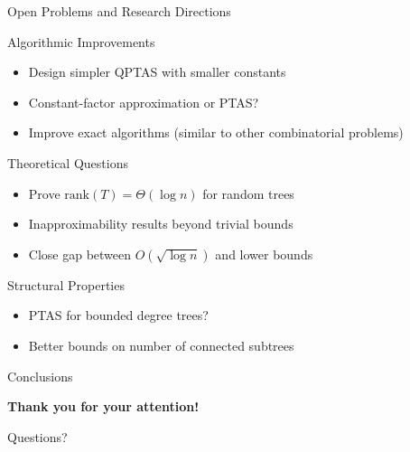 \documentclass[aspectratio=169]{beamer}
\begin{document}
\begin{frame}{Open Problems and Research Directions}
\begin{block}{Algorithmic Improvements}
\begin{itemize}
    \item Design simpler QPTAS with smaller constants
    \item Constant-factor approximation or PTAS?
    \item Improve exact algorithms (similar to other combinatorial problems)
\end{itemize}
\end{block}

\pause

\begin{block}{Theoretical Questions}
\begin{itemize}
    \item Prove $\text{rank}(T) = \Theta(\log n)$ for random trees
    \item Inapproximability results beyond trivial bounds
    \item Close gap between $O(\sqrt{\log n})$ and lower bounds
\end{itemize}
\end{block}

\pause

\begin{block}{Structural Properties}
\begin{itemize}
    \item PTAS for bounded degree trees?
    \item Better bounds on number of connected subtrees
\end{itemize}
\end{block}
\end{frame}

\begin{frame}{Conclusions}
\begin{center}
\Large
\textbf{Thank you for your attention!}

\vspace{1cm}

Questions?
\end{center}
\end{frame}
\end{document}

